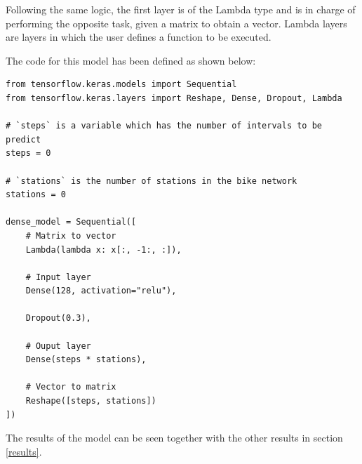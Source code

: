 Following the same logic, the first layer is of the Lambda type and is in charge of performing the opposite task, given a matrix to obtain a vector. Lambda layers are layers in which the user defines a function to be executed.
\newline

The code for this model has been defined as shown below:

\begin{verbatim}
from tensorflow.keras.models import Sequential
from tensorflow.keras.layers import Reshape, Dense, Dropout, Lambda

# `steps` is a variable which has the number of intervals to be predict
steps = 0 

# `stations` is the number of stations in the bike network
stations = 0

dense_model = Sequential([
    # Matrix to vector
    Lambda(lambda x: x[:, -1:, :]), 
    
    # Input layer
    Dense(128, activation="relu"),

    Dropout(0.3),
    
    # Ouput layer
    Dense(steps * stations),
                  
    # Vector to matrix
    Reshape([steps, stations])
])
\end{verbatim}


The results of the model can be seen together with the other results in section \ref{results}.